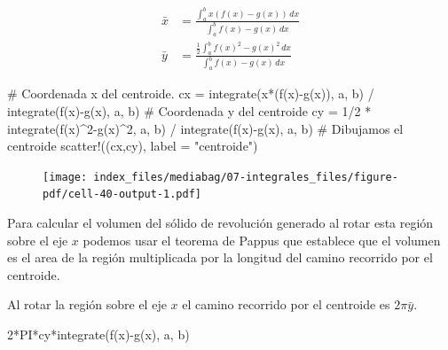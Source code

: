 \documentclass[
  a4paper,
]{scrreport}
\newenvironment{Shaded}{\begin{snugshade}}{\end{snugshade}}
\newcommand{\CommentTok}[1]{\textcolor[rgb]{0.37,0.37,0.37}{#1}}
\newcommand{\FloatTok}[1]{\textcolor[rgb]{0.68,0.00,0.00}{#1}}
\newcommand{\FunctionTok}[1]{\textcolor[rgb]{0.28,0.35,0.67}{#1}}
\newcommand{\NormalTok}[1]{\textcolor[rgb]{0.00,0.23,0.31}{#1}}
\newcommand{\OperatorTok}[1]{\textcolor[rgb]{0.37,0.37,0.37}{#1}}
\newcommand{\StringTok}[1]{\textcolor[rgb]{0.13,0.47,0.30}{#1}}
\theoremstyle{definition}
\theoremstyle{remark}
\begin{document}
\begin{tcolorbox}
\begin{align*}
\bar x &=\frac{\int_a^b x (f(x)-g(x))\,dx}{\int_a^b f(x)-g(x)\,dx}\\
\bar y &=\frac{\frac{1}{2}\int_a^b f(x)^2-g(x)^2\,dx}{\int_a^b f(x)-g(x)\,dx}
\end{align*}

\begin{Shaded}
\begin{Highlighting}[]
\CommentTok{\# Coordenada x del centroide.}
\NormalTok{cx }\OperatorTok{=} \FunctionTok{integrate}\NormalTok{(}\FunctionTok{x*}\NormalTok{(}\FunctionTok{f}\NormalTok{(x)}\FunctionTok{{-}g}\NormalTok{(x)), a, b) }\OperatorTok{/} \FunctionTok{integrate}\NormalTok{(}\FunctionTok{f}\NormalTok{(x)}\FunctionTok{{-}g}\NormalTok{(x), a, b)}
\CommentTok{\# Coordenada y del centroide}
\NormalTok{cy }\OperatorTok{=} \FloatTok{1}\OperatorTok{/}\FloatTok{2} \OperatorTok{*} \FunctionTok{integrate}\NormalTok{(}\FunctionTok{f}\NormalTok{(x)}\OperatorTok{\^{}}\FloatTok{2}\FunctionTok{{-}g}\NormalTok{(x)}\OperatorTok{\^{}}\FloatTok{2}\NormalTok{, a, b) }\OperatorTok{/} \FunctionTok{integrate}\NormalTok{(}\FunctionTok{f}\NormalTok{(x)}\FunctionTok{{-}g}\NormalTok{(x), a, b)}
\CommentTok{\# Dibujamos el centroide}
\FunctionTok{scatter!}\NormalTok{((cx,cy), label }\OperatorTok{=} \StringTok{"centroide"}\NormalTok{)}
\end{Highlighting}
\end{Shaded}

\begin{figure}[H]

{\centering \texttt{[image: index\_files/mediabag/07-integrales\_files/figure-pdf/cell-40-output-1.pdf]}

}

\end{figure}

Para calcular el volumen del sólido de revolución generado al rotar esta
región sobre el eje \(x\) podemos usar el teorema de Pappus que
establece que el volumen es el area de la región multiplicada por la
longitud del camino recorrido por el centroide.

Al rotar la región sobre el eje \(x\) el camino recorrido por el
centroide es \(2\pi \bar y\).

\begin{Shaded}
\begin{Highlighting}[]
\FloatTok{2}\FunctionTok{*PI*cy*integrate}\NormalTok{(}\FunctionTok{f}\NormalTok{(x)}\FunctionTok{{-}g}\NormalTok{(x), a, b)}
\end{Highlighting}
\end{Shaded}


\end{tcolorbox}
\end{document}
